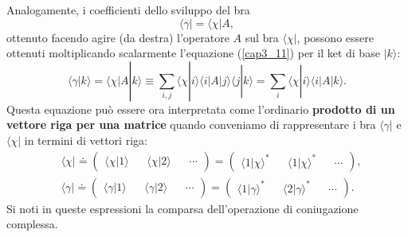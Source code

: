 Analogamente, i coefficienti dello sviluppo del bra
	\begin{equation}
	\langle \gamma | = \langle \chi | A ,
	\end{equation}
ottenuto facendo agire (da destra) l'operatore $A$ sul bra $\langle \chi | $, possono essere ottenuti moltiplicando scalarmente l'equazione (\ref{cap3_11}) per il ket di base $| k \rangle$:
	\begin{equation}
	\langle \gamma | k \rangle = \langle \chi | A | k \rangle \equiv \sum \limits_{i,j}  \langle \chi | i \rangle \langle i | A | j \rangle  \langle j | k \rangle = \sum \limits_{i} \langle \chi | i \rangle  \langle i | A | k \rangle .
	\end{equation}
Questa equazione può essere ora interpretata come l'ordinario \textbf{prodotto di un vettore riga per una matrice} quando conveniamo di rappresentare i bra $ \langle \gamma |$ e  $\langle \chi |$ in termini di vettori riga:
	\begin{equation}
		\boxed{
		\begin{aligned}
			&\langle \chi | \doteq 
			\begin{pmatrix}
			\langle \chi | 1 \rangle && \langle \chi | 2 \rangle && \cdots 
			\end{pmatrix}
 			= 
			\begin{pmatrix}
			\langle 1 | \chi \rangle ^* && \langle 1 | \chi \rangle ^* && \cdots
			\end{pmatrix} ,
			\\
			& \langle \gamma | \doteq 
			\begin{pmatrix}
			\langle \gamma | 1 \rangle && \langle \gamma | 2 \rangle && \cdots 
			\end{pmatrix}
			 = 
			\begin{pmatrix}
			\langle 1 | \gamma \rangle ^* && \langle 2 | \gamma \rangle ^* && \cdots
			\end{pmatrix} .
		\end{aligned}
		}
	\end{equation}
Si noti in queste espressioni la comparsa dell'operazione di coniugazione complessa.\\

